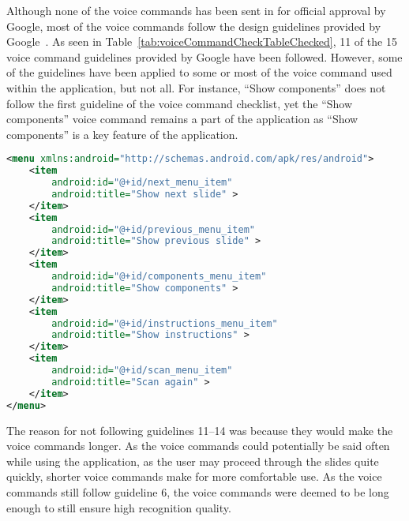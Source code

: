 Although none of the voice commands has been sent in for official approval by Google, most of the voice commands follow the design guidelines provided by Google~\cite{glassVoiceChecklist}. As seen in Table~\ref{tab:voiceCommandCheckTableChecked}, 11 of the 15 voice command guidelines provided by Google have been followed. However, some of the guidelines have been applied to some or most of the voice command used within the application, but not all. For instance, ``Show components'' does not follow the first guideline of the voice command checklist, yet the ``Show components'' voice command remains a part of the application as ``Show components'' is a key feature of the application.

\newpage
\begin{lstlisting}[language=XML, caption={The voice command menu XML file}, label=voiceCommandXML]
<menu xmlns:android="http://schemas.android.com/apk/res/android">
	<item
		android:id="@+id/next_menu_item"
		android:title="Show next slide" >
	</item>
	<item
		android:id="@+id/previous_menu_item"
		android:title="Show previous slide" >
	</item>
	<item
		android:id="@+id/components_menu_item"
		android:title="Show components" >
	</item>
	<item
		android:id="@+id/instructions_menu_item"
		android:title="Show instructions" >
	</item>
	<item
		android:id="@+id/scan_menu_item"
		android:title="Scan again" >
	</item>
</menu>
\end{lstlisting}


\newpage
The reason for not following guidelines 11--14 was because they would make the voice commands longer. As the voice commands could potentially be said often while using the application, as the user may proceed through the slides quite quickly, shorter voice commands make for more comfortable use. As the voice commands still follow guideline 6, the voice commands were deemed to be long enough to still ensure high recognition quality.